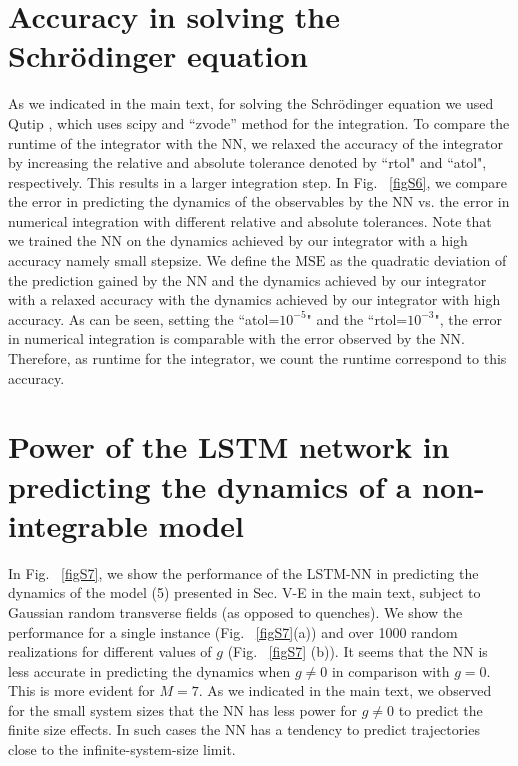 \documentclass[a4paper,aps,amsmath,amssymb,twocolumn,longbibliography,,accepted=2022-05-17]{quantumarticle}
\begin{document}
\section{Accuracy in solving the Schr\"odinger equation}
As we indicated in the main text, for solving the Schr\"odinger equation we used Qutip \cite{johansson2012qutip}, which uses scipy 
and ``zvode'' method for the integration. To compare the runtime of the integrator with the NN,  we relaxed the accuracy of the integrator by increasing the relative  and  absolute tolerance denoted by ``rtol" and ``atol", respectively. This results in a larger integration step. In Fig. ~\ref{figS6}, we compare the error in predicting the dynamics of the observables by the NN vs. the error in numerical integration with different relative  and  absolute tolerances. Note that we trained the NN on the dynamics achieved  by our integrator with a high accuracy namely small stepsize. We define  the $\textrm{MSE}$ as the quadratic deviation of  the prediction gained by the NN and the dynamics achieved by our integrator with a relaxed accuracy with the dynamics achieved by our integrator with high accuracy.  As can be seen, setting the ``atol=$10^{-5}$" and the ``rtol=$10^{-3}$",  the error in numerical integration is comparable with the error observed by the NN. Therefore, as runtime for the integrator, we count the runtime correspond to this accuracy.  



\section{Power of the LSTM network in predicting the dynamics of a non-integrable model}
In Fig.~ \ref{figS7}, we show the performance of the LSTM-NN in predicting the dynamics of the model (5) presented in Sec. V-E in the main text, subject to Gaussian random transverse fields (as opposed to quenches). %
We show the performance for a single instance (Fig.~ \ref{figS7}(a)) and  over 1000 random realizations for different  values of $g$ (Fig.~ \ref{figS7} (b)). It seems that the NN is less accurate in predicting the dynamics when $g \neq 0$ in comparison with  $g=0$. This is more evident for $M=7$. As we indicated in the main text, we observed for the small system sizes that the NN has less power for $g \neq 0$ to predict the finite size effects. In such cases the NN has a tendency to predict trajectories close to the infinite-system-size limit. %
\end{document}

